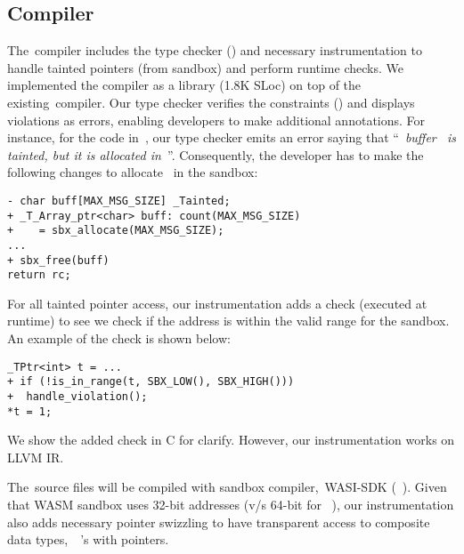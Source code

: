 
\subsection{Compiler}
\label{subsec:compilerimple}
The~\systemname compiler includes the type checker () and necessary instrumentation to handle tainted pointers (\ie from sandbox) and perform runtime checks.
We implemented the compiler as a library (1.8K SLoc) on top of the existing~\checkedc compiler.
Our type checker verifies the constraints () and displays violations as errors, enabling developers to make additional annotations.
For instance, for the code in~, our type checker emits an error saying that ``~\emph{buffer~ is tainted, but it is allocated in~\cregion}''.
Consequently, the developer has to make the following changes to allocate~ in the sandbox:
\begin{verbatim}
- char buff[MAX_MSG_SIZE] _Tainted;
+ _T_Array_ptr<char> buff: count(MAX_MSG_SIZE)
+    = sbx_allocate(MAX_MSG_SIZE);
...
+ sbx_free(buff)
return rc;
\end{verbatim}

For all tainted pointer access, our instrumentation adds a check (executed at runtime) to see we check if the address is within the valid range for the sandbox. An example of the check is shown below:
\begin{verbatim}
_TPtr<int> t = ...
+ if (!is_in_range(t, SBX_LOW(), SBX_HIGH()))
+  handle_violation();
*t = 1;
\end{verbatim}
We show the added check in C for clarify. However, our instrumentation works on LLVM IR.

The~\ucregion source files will be compiled with sandbox compiler,~\ie WASI-SDK (~\cite{wasi-clang}).
Given that WASM sandbox uses 32-bit addresses (v/s 64-bit for~
\cregion), our instrumentation also adds necessary pointer swizzling to have transparent access to composite data types,~\ie~'s with pointers. 

